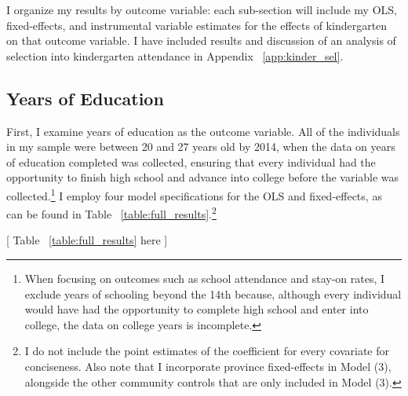 \def \data #1{/Users/danielposthumus/thesis_independent_study/work/writing/rough_draft/analysis/#1}

I organize my results by outcome variable: each sub-section will include my OLS, fixed-effects, and instrumental variable estimates for the effects of kindergarten on that outcome variable. I have included results and discussion of an analysis of selection into kindergarten attendance in Appendix ~\ref{app:kinder_sel}. 

\subsection{Years of Education}

First, I examine years of education as the outcome variable. All of the individuals in my sample were between 20 and 27 years old by 2014, when the data on years of education completed was collected, ensuring that every individual had the opportunity to finish high school and advance into college before the variable was collected.\footnote{When focusing on outcomes such as school attendance and stay-on rates, I exclude years of schooling beyond the 14th because, although every individual would have had the opportunity to complete high school and enter into college, the data on college years is incomplete.} I employ four model specifications for the OLS and fixed-effects, as can be found in Table ~\ref{table:full_results}.\footnote{I do not include the point estimates of the coefficient for every covariate for conciseness. Also note that I incorporate province fixed-effects in Model (3), alongside the other community controls that are only included in Model (3).}
\begin{center}
	[ Table ~\ref{table:full_results} here ]
\end{center}
